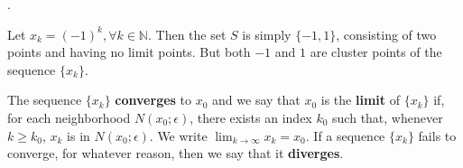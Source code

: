 \documentclass[8pt]{beamer}
\newcommand{\mbb}[1]{\mathbb{#1}}
\newcommand{\tb}[1]{\textbf{#1}}
\begin{document}
\begin{frame}{.}
    \begin{example}
        Let $x_k = (-1)^k, \forall k \in \mbb{N}$.
        Then the set $S$ is simply $\{-1, 1\}$, consisting of two points and having no limit points.
        But both $-1$ and $1$ are cluster points of the sequence $\{x_k\}$.
    \end{example}

    \begin{definition}
        The sequence $\{x_k\}$ \tb{converges} to $x_0$ and we say that $x_0$ is the \tb{limit} of $
        \{x_k\}$ if, for each neighborhood $N(x_0; \epsilon)$, there exists an index $k_0$ such that, whenever $k \geq k_0$, $x_k$ is in $N(x_0; \epsilon)$.
        We write $\lim_{k \to \infty} x_k = x_0$.
        If a sequence $\{x_k\}$ fails to converge, for whatever reason, then we say that it \tb{diverges}.
    \end{definition}
\end{frame}
\end{document}

